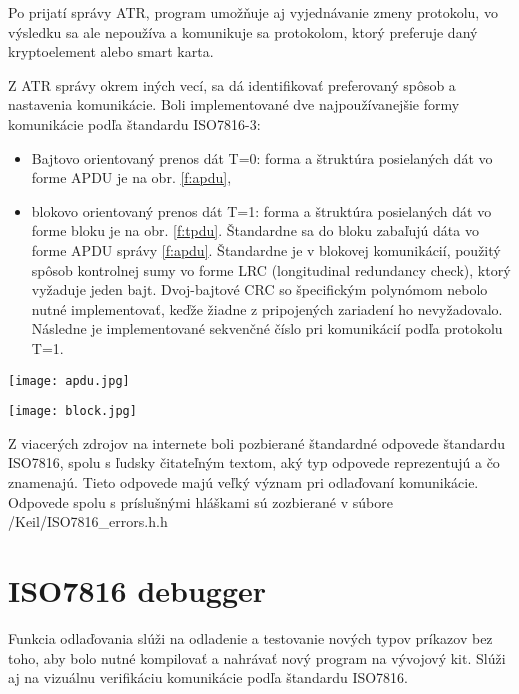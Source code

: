 \documentclass[12pt,a4paper,oneside,openright]{report}
\begin{document}
	Po prijatí správy ATR, program umožňuje aj vyjednávanie zmeny protokolu, vo výsledku sa ale nepoužíva a komunikuje sa protokolom, ktorý preferuje daný kryptoelement alebo smart karta.
	
	Z ATR správy okrem iných vecí, sa dá identifikovať preferovaný spôsob a nastavenia komunikácie. Boli implementované dve najpoužívanejšie formy komunikácie podľa štandardu ISO7816-3:
		\singlespacing
	\begin{itemize}
		\item Bajtovo orientovaný prenos dát T=0: forma a štruktúra posielaných dát vo forme APDU je na obr. \ref{f:apdu},
		\item blokovo orientovaný prenos dát T=1: forma a štruktúra posielaných dát vo forme bloku je na obr. \ref{f:tpdu}. Štandardne sa do bloku zabaľujú dáta vo forme APDU správy \ref{f:apdu}. Štandardne je v blokovej komunikácií, použitý spôsob kontrolnej sumy vo forme LRC (longitudinal redundancy check), ktorý vyžaduje jeden bajt. Dvoj-bajtové CRC so špecifickým polynómom nebolo nutné implementovať, keďže žiadne z pripojených zariadení ho nevyžadovalo. Následne je implementované sekvenčné číslo pri komunikácií podľa protokolu T=1.
	\end{itemize}
	\onehalfspacing
	
	\begin{figure*}[h]
		\centering
		\texttt{[image: apdu.jpg]}
		\caption{Štandardný format APDU správy podľa štandardu ISO7816\cite{smartcard}.}
		\label{f:apdu}
	\end{figure*}
	
	\begin{figure*}[h]
		\centering
		\texttt{[image: block.jpg]}
		\caption{Blokový formát komunikácie podľa štandardu ISO7816 \cite{SmartCardTutorial}.}
		\label{f:tpdu}
	\end{figure*}


	Z viacerých zdrojov na internete boli pozbierané štandardné odpovede štandardu ISO7816, spolu s ľudsky čitateľným textom, aký typ odpovede  reprezentujú a čo znamenajú. Tieto odpovede majú veľký význam pri odlaďovaní komunikácie. Odpovede spolu s príslušnými hláškami sú zozbierané v súbore /Keil/ISO7816\_errors.h.h


\section{ISO7816 debugger} \label{isodebug}
	Funkcia odlaďovania slúži na odladenie a testovanie nových typov príkazov bez toho, aby bolo nutné kompilovať a nahrávať nový program na vývojový kit. Slúži aj na vizuálnu verifikáciu komunikácie podľa štandardu ISO7816. 
	
\end{document}
